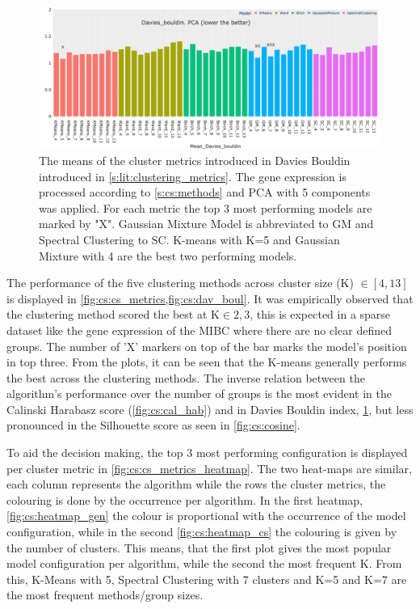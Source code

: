 \begin{figure}[!htb]    
    \centering
    \includegraphics[width=1.0\textwidth,keepaspectratio]{Sections/ClusteringAnalysis/Resources/cs_top3/PCA_top3_Davies_bouldin.png}
    \caption{The means of the cluster metrics introduced in Davies Bouldin introduced in \cref{s:lit:clustering_metrics}. The gene expression is processed according to \cref{s:cs:methods} and PCA with 5 components was applied. For each metric the top 3 most performing models are marked by "X". Gaussian Mixture Model is abbreviated to GM and Spectral Clustering to SC. K-means with K=5 and Gaussian Mixture with 4 are the best two performing models.}
    \label{fig:cs:dav_boul}
\end{figure}

The performance of the five clustering methods across cluster size (K) $\in[4, 13]$ is displayed in \cref{fig:cs:cs_metrics,fig:cs:dav_boul}. It was empirically observed that the clustering method scored the best at K$\in{2,3}$, this is expected in a sparse dataset like the gene expression of the MIBC where there are no clear defined groups.  The number of 'X' markers on top of the bar marks the model's position in top three. From the plots, it can be seen that the K-means generally performs the best across the clustering methods. The inverse relation between the algorithm's performance over the number of groups is the most evident in the Calinski Harabasz score (\cref{fig:cs:cal_hab}) and in Davies Bouldin index, \cref{fig:cs:dav_boul}, but less pronounced in the Silhouette score as seen in \cref{fig:cs:cosine}.


To aid the decision making, the top 3 most performing configuration is displayed per cluster metric in \cref{fig:cs:cs_metrics_heatmap}. The two heat-maps are similar, each column represents the algorithm while the rows the cluster metrics, the colouring is done by the occurrence per algorithm. In the first heatmap, \cref{fig:cs:heatmap_gen} the colour is proportional with the occurrence of the model configuration, while in the second \cref{fig:cs:heatmap_cs} the colouring is given by the number of clusters. This means, that the first plot gives the most popular model configuration per algorithm, while the second the most frequent K. From this, K-Means with 5, Spectral Clustering with 7 clusters and K=5 and K=7 are the most frequent methods/group sizes. 

